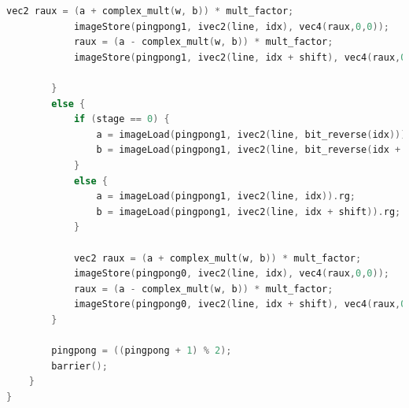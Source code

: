 \documentclass[
  oneside,
  11pt, a4paper,
  footinclude=true,
  headinclude=true,
  cleardoublepage=empty
]{scrbook}
\begin{document}
\begin{lstlisting}[language=C,caption={FFT Radix-2 Cooley-Tukey Vertical unique pass, see \autoref{subsec:all-stages-in-one-pass}},label={lst:glsl-radix2-ct-unique-vertical}]
            vec2 raux = (a + complex_mult(w, b)) * mult_factor;
            imageStore(pingpong1, ivec2(line, idx), vec4(raux,0,0));
            raux = (a - complex_mult(w, b)) * mult_factor;
            imageStore(pingpong1, ivec2(line, idx + shift), vec4(raux,0,0));

        }
        else {
            if (stage == 0) {
                a = imageLoad(pingpong1, ivec2(line, bit_reverse(idx))).rg;
                b = imageLoad(pingpong1, ivec2(line, bit_reverse(idx + shift))).rg;
            }
            else {	
                a = imageLoad(pingpong1, ivec2(line, idx)).rg;
                b = imageLoad(pingpong1, ivec2(line, idx + shift)).rg;
            }

            vec2 raux = (a + complex_mult(w, b)) * mult_factor;
            imageStore(pingpong0, ivec2(line, idx), vec4(raux,0,0));
            raux = (a - complex_mult(w, b)) * mult_factor;
            imageStore(pingpong0, ivec2(line, idx + shift), vec4(raux,0,0));
        }
        
        pingpong = ((pingpong + 1) % 2);
        barrier();
    }
}
\end{lstlisting}
\end{document}
